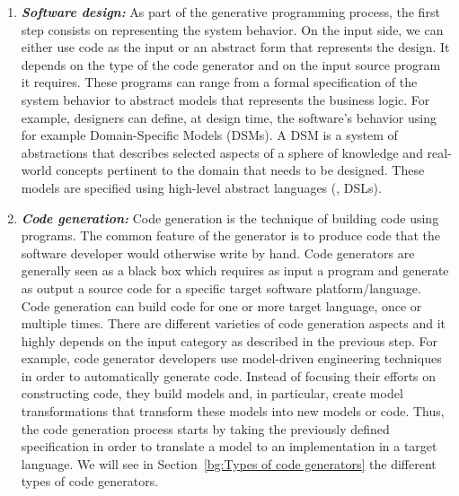 \begin{enumerate}
	\item \textbf{\textit{Software design:}} 
	As part of the generative programming process, the first step consists on representing the system behavior. 
	On the input side, we can either use code as the input or an abstract form that represents the design. It depends on the type of the code generator and on the input source program it requires. These programs can range from a formal specification of the system behavior to abstract models that represents the business logic.
	For example, designers can define, at design time, the software's behavior using for example Domain-Specific Models (DSMs).
	A DSM is a system of abstractions that describes selected aspects of a sphere of knowledge and real-world concepts pertinent to the domain that needs to be designed. These models are specified using high-level abstract languages (\ie, DSLs). %
	
	\item \textbf{\textit{Code generation:}} 
	Code generation is the technique of building code using programs. The common feature of the generator is to produce code that the software developer would otherwise write by hand.
	Code generators are generally seen as a black box which requires as input a program and generate as output a source code for a specific target software platform/language. %
	Code generation can build code for one or more target language, once or multiple times. There are different varieties of code generation aspects and it highly depends on the input category as described in the previous step. 
	For example, code generator developers use model-driven engineering techniques in order to automatically generate code. Instead of focusing their efforts on constructing code, they build models and, in particular, create model transformations that transform these models into new models or code. Thus, the code generation process starts by taking the previously defined specification in order to translate a model to an implementation in a target language. We will see in Section~\ref{bg:Types of code generators} the different types of code generators.
	

\end{enumerate}

